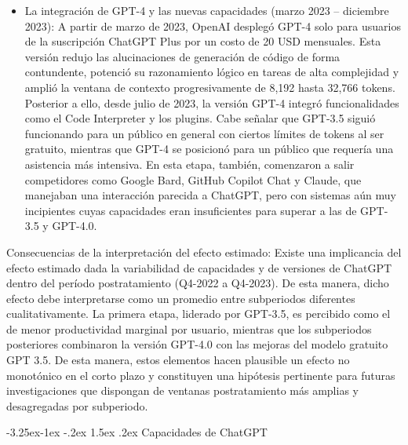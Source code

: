 \documentclass[12pt,a4paper]{article}
\makeatletter
\let\textbf\textmd
\renewcommand\subsection{\@startsection{subsection}{2}{\z@}%
  {-3.25ex\@plus -1ex \@minus -.2ex}%
  {1.5ex \@plus .2ex}%
  {\normalfont\normalsize}}
\makeatother
\begin{document}
\begin{itemize}
\item \textbf{La integración de GPT-4 y las nuevas capacidades (marzo 2023 – diciembre 2023):} A partir de marzo de 2023, OpenAI desplegó GPT-4 solo para usuarios de la suscripción ChatGPT Plus por un costo de 20 USD mensuales. Esta versión redujo las alucinaciones de generación de código de forma contundente, potenció su razonamiento lógico en tareas de alta complejidad y amplió la ventana de contexto progresivamente de 8,192 hasta 32,766 tokens. Posterior a ello, desde julio de 2023, la versión GPT-4 integró funcionalidades como el Code Interpreter y los plugins. Cabe señalar que GPT-3.5 siguió funcionando para un público en general con ciertos límites de tokens al ser gratuito, mientras que GPT-4 se posicionó para un público que requería una asistencia más intensiva. En esta etapa, también, comenzaron a salir competidores como Google Bard, GitHub Copilot Chat y Claude, que manejaban una interacción parecida a ChatGPT, pero con sistemas aún muy incipientes cuyas capacidades eran insuficientes para superar a las de GPT-3.5 y GPT-4.0.

\end{itemize}

\textbf{Consecuencias de la interpretación del efecto estimado:} Existe una implicancia del efecto estimado dada la variabilidad de capacidades y de versiones de ChatGPT dentro del período postratamiento (Q4-2022 a Q4-2023). De esta manera, dicho efecto debe interpretarse como un promedio entre subperiodos diferentes cualitativamente. La primera etapa, liderado por GPT-3.5, es percibido como el de menor productividad marginal por usuario, mientras que los subperiodos posteriores combinaron la versión GPT-4.0 con las mejoras del modelo gratuito GPT 3.5. De esta manera, estos elementos hacen plausible un efecto no monotónico en el corto plazo y constituyen una hipótesis pertinente para futuras investigaciones que dispongan de ventanas postratamiento más amplias y desagregadas por subperiodo. 


\subsection{Capacidades de ChatGPT}
\end{document}

